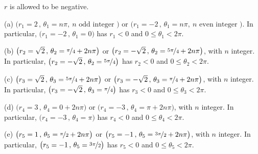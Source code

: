 \begin{hint} 
$r$ is allowed to be negative.
\end{hint}

\begin{answer} 
(a) $\big(r_1=2\,,\,\theta_1= n\pi,\ n\text{ odd integer }\big)$ or 
    $\big(r_1=-2\,,\,\theta_1= n\pi,\ n\text{ even integer }\big)$.
    In particular,  $\big(r_1=-2\,,\,\theta_1= 0\big)$ has $r_1<0$
    and $0\le\theta_1<2\pi$.

(b) $\big(r_2=\sqrt{2}\,,\,\theta_2= \nicefrac{\pi}{4} + 2n\pi\big)$ or 
    $\big(r_2=-\sqrt{2}\,,\,\theta_2= \nicefrac{5\pi}{4} + 2n\pi\big)$,
    with $n$ integer. In particular,  $\big(r_2=-\sqrt{2}\,,\,
    \theta_2= \nicefrac{5\pi}{4}\big)$ has $r_2<0$
    and $0\le\theta_2<2\pi$.

(c) $\big(r_3=\sqrt{2}\,,\,\theta_3= \nicefrac{5\pi}{4} + 2n\pi\big)$ or 
    $\big(r_3=-\sqrt{2}\,,\,\theta_3= \nicefrac{\pi}{4} + 2n\pi\big)$,
    with $n$ integer. In particular,  $\big(r_3=-\sqrt{2}\,,\,
    \theta_3= \nicefrac{\pi}{4}\big)$ has $r_3<0$
    and $0\le\theta_3<2\pi$.

(d) $\big(r_4=3\,,\,\theta_4= 0 + 2n\pi\big)$ or 
    $\big(r_4=-3\,,\,\theta_4= \pi + 2n\pi\big)$,
    with $n$ integer. In particular,  $\big(r_4=-3\,,\,
    \theta_4= \pi\big)$ has $r_4<0$ and $0\le\theta_4<2\pi$.

(e) $\big(r_5=1\,,\,\theta_5= \nicefrac{\pi}{2} + 2n\pi\big)$ or 
    $\big(r_5=-1\,,\,\theta_5= \nicefrac{3\pi}{2} + 2n\pi\big)$,
    with $n$ integer. In particular,  $\big(r_5=-1\,,\,
    \theta_5= \nicefrac{3\pi}{2}\big)$ has $r_5<0$
    and $0\le\theta_5<2\pi$.
\end{answer}


